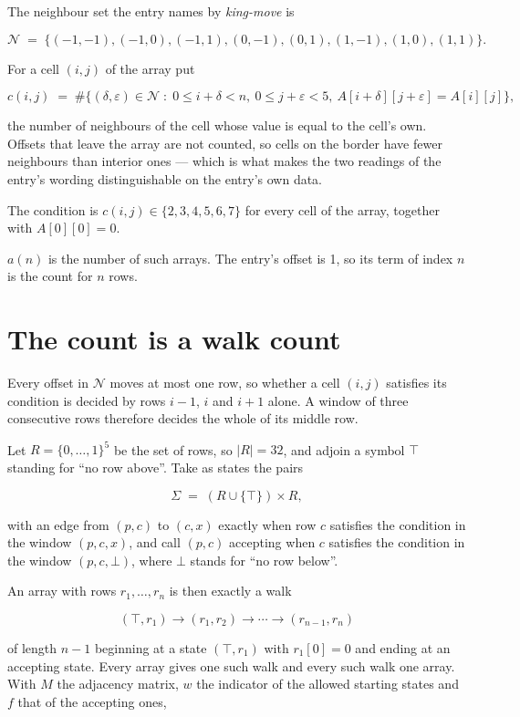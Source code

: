 \documentclass[11pt]{article}
\theoremstyle{definition}
\begin{document}
The neighbour set the entry names by {\itshape king-move} is

\[\mathcal{N} \;=\; \{(-1,-1), (-1,0), (-1,1), (0,-1), (0,1), (1,-1), (1,0), (1,1)\}.\]

For a cell $(i,j)$ of the array put

\[c(i,j) \;=\; \#\bigl\{(\delta,\varepsilon)\in\mathcal{N} \;:\; 0\le i+\delta<n,\ 0\le j+\varepsilon<5,\ A[i+\delta][j+\varepsilon] = A[i][j]\bigr\},\]

the number of neighbours of the cell whose value is equal to the cell's own. Offsets that leave the array are not counted, so cells on the border have fewer neighbours than interior ones --- which is what makes the two readings of the entry's wording distinguishable on the entry's own data.

The condition is $c(i,j) \in \{2, 3, 4, 5, 6, 7\}$ for every cell of the array, together with $A[0][0]=0$.

$a(n)$ is the number of such arrays. The entry's offset is 1, so its term of index $n$ is the count for $n$ rows.

\section{The count is a walk count}

Every offset in $\mathcal{N}$ moves at most one row, so whether a cell $(i,j)$ satisfies its condition is decided by rows $i-1$, $i$ and $i+1$ alone. A window of three consecutive rows therefore decides the whole of its middle row.

Let $R = \{0,\dots,1\}^{5}$ be the set of rows, so $|R| = 32$, and adjoin a symbol $\top$ standing for ``no row above''. Take as states the pairs

\[\Sigma \;=\; (R \cup \{\top\}) \times R,\]

with an edge from $(p,c)$ to $(c,x)$ exactly when row $c$ satisfies the condition in the window $(p,c,x)$, and call $(p,c)$ accepting when $c$ satisfies the condition in the window $(p,c,\bot)$, where $\bot$ stands for ``no row below''.

An array with rows $r_1,\dots,r_n$ is then exactly a walk

\[(\top,r_1) \to (r_1,r_2) \to \cdots \to (r_{n-1},r_n)\]

of length $n-1$ beginning at a state $(\top,r_1)$ with $r_1[0]=0$ and ending at an accepting state. Every array gives one such walk and every such walk one array. With $M$ the adjacency matrix, $w$ the indicator of the allowed starting states and $f$ that of the accepting ones,
\end{document}
